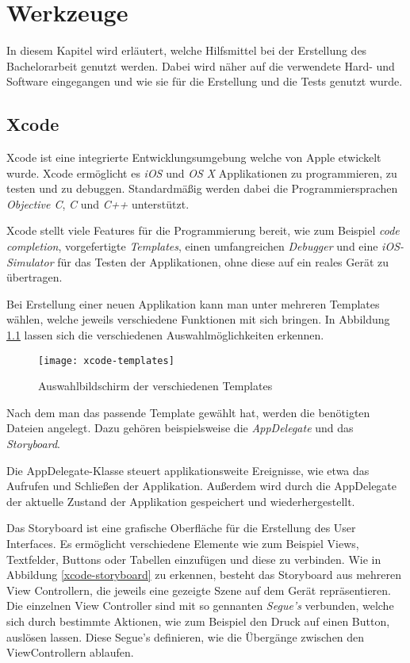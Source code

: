 \chapter{Werkzeuge}
\label{chap:tools}
In diesem Kapitel wird erläutert, welche Hilfsmittel bei der Erstellung des Bachelorarbeit genutzt werden.
Dabei wird näher auf die verwendete Hard- und Software eingegangen und wie sie für die Erstellung und die Tests genutzt wurde.


\section{Xcode}
\label{sec:tools:xcode}
Xcode ist eine integrierte Entwicklungsumgebung welche von Apple etwickelt wurde. Xcode ermöglicht es \emph{iOS} und \emph{OS X} Applikationen zu programmieren, zu testen und zu debuggen.
Standardmäßig werden dabei die Programmiersprachen \emph{Objective C}, \emph{C} und \emph{C++} unterstützt.

Xcode stellt viele Features für die Programmierung bereit, wie zum Beispiel \emph{code completion}, vorgefertigte \emph{Templates}, einen umfangreichen \emph{Debugger} und eine \emph{iOS-Simulator} für das Testen der Applikationen, ohne diese auf ein reales Gerät zu übertragen.

Bei Erstellung einer neuen Applikation kann man unter mehreren Templates wählen, welche jeweils verschiedene Funktionen mit sich bringen. In Abbildung \ref{xcode-templates} lassen sich die verschiedenen Auswahlmöglichkeiten erkennen.

\begin{figure}[htb!]
		\centering
	\texttt{[image: xcode-templates]}
	\caption{Auswahlbildschirm der verschiedenen Templates}
	\label{xcode-templates}
\end{figure}

Nach dem man das passende Template gewählt hat, werden die benötigten Dateien angelegt.
Dazu gehören beispielsweise die \emph{AppDelegate} und das \emph{Storyboard}.

Die AppDelegate-Klasse steuert applikationsweite Ereignisse, wie etwa das Aufrufen und Schließen der Applikation. Außerdem wird durch die AppDelegate der aktuelle Zustand der Applikation gespeichert und wiederhergestellt.

Das Storyboard ist eine grafische Oberfläche für die Erstellung des User Interfaces. Es ermöglicht verschiedene Elemente wie zum Beispiel Views, Textfelder, Buttons oder Tabellen einzufügen und diese zu verbinden. Wie in Abbildung \ref{xcode-storyboard} zu erkennen, besteht das Storyboard aus mehreren View Controllern, die jeweils eine gezeigte Szene auf dem Gerät repräsentieren. Die einzelnen View Controller sind mit so gennanten \emph{Segue's} verbunden, welche sich durch bestimmte Aktionen, wie zum Beispiel den Druck auf einen Button, auslösen lassen. Diese Segue's definieren, wie die Übergänge zwischen den ViewControllern ablaufen.

